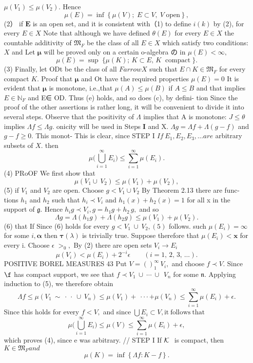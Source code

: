 $\mu(V_{1})\leq\mu(V_{2}).$ Hence $$ \mu(E)=\operatorname*{inf}\left\{\mu(V);\;E\subset V,\;V\;\mathrm{open}\right\}\!, $$ (2） if $\boldsymbol{E}$ is an open set, and it is consistent with（1) to define $\scriptstyle{i(k)}$ by (2), for every $\scriptstyle{E\in X}$ Note that although we have defined $\scriptstyle{\theta(E)}$ for every $\scriptstyle{E\in X}$ the countable additivity of ${\mathfrak{M}}_{F}$ be the class of all $\scriptstyle{E\in X}$ which satisfy two conditions: $X$ and Let ${\boldsymbol{\mu}}$ will be proved only on a certain o-algebra の in $\mu(E)<\infty,$ $$ \mu(E)=\operatorname*{sup}\;\{\mu(K);\,K\subset E,\,K\;\operatorname{compact}\}. $$ (3) Finally, let ODt be the class of all $\scriptstyle{F arrow X}$ such that $E\cap K\in{\mathfrak{M}}_{F}$ for every compact $K.$ Proof that ${\boldsymbol{\mu}}$ and Ot have the required properties $\mu(E)=0$ It is evident that $\boldsymbol{\mu}$ is monotone, i.e.,that $\mu(A)\leq\mu(B)$ if $\scriptstyle A\leq B$ and that implies $E\in\mathbb{N}_{F}$ and E∈ OD. Thus (e) holds, and so does (c), by defini- tion Since the proof of the other assertions is rather long, it will be convenient to divide it into several steps. Observe that the positivity of $\Lambda$ implies that A is monotone: $\scriptstyle J\leq\theta$ implies $\Lambda f\leq\Lambda g.$ onicity will be used in Steps $\mathbf{I}$ and $\mathrm{X}.$ $\Lambda g=\Lambda f+\Lambda(g-f)$ and $g-f\geq0.$ This monot- This is clear, since STEP I $I f\ E_{1},E_{2},E_{3},\dots a r e$ arbitrary subsets of $X.$ then $$ \mu{\Bigg(}\bigcup_{i=1}^{\infty}E_{i}{\Bigg)}\leq\sum_{i=1}^{\infty}\mu(E_{i}). $$ (4) PRoOF We first show that $$ \mu(V_{1}\cup\ V_{2})\leq\mu(V_{1})+\mu(V_{2}), $$ (5) if ${\mathit{V}}_{1}$ and ${\mathit{V}}_{2}$ are open. Choose $g<V_{1}\cup V_{2}$ By Theorem 2.13 there are func- tions $h_{1}$ and $h_{2}$ such that $h_{i}\prec V_{i}$ and $h_{1}(x)+h_{2}(x)=1$ for all x in the support of ${\mathfrak{g}}.$ Hence $h_{i}g\prec V_{i},g=h_{1}g+h_{2}\,g,$ and so $$ \Lambda g=\Lambda(h_{1}g)+\Lambda(h_{2}g)\leq\mu(V_{1})+\mu(V_{2}). $$ (6) that If Since (6) holds for every $g<V_{1}\ \cup\ V_{2},(5)$ follows. such $\mu(E_{i})=\infty$ for some $i,\mathbf{\alpha}$ then $\mathbf{\tau}(\lambda)$ is trivially true. Suppose therefore that $\mu(E_{i})<\mathbf{x}$ for every i. Choose $\scriptstyle\epsilon\;>_{0},$ By (2) there are open sets $V_{i}\to E_{i}$ $$ \mu(V_{i})<\mu(E_{i})+2^{-i}\epsilon\qquad(i=1,\,2,\,3,\,\ldots). $$POSITIVE BOREL MEASURES 43 Put $V=\left(\right)_{1}^{\infty}\,V_{i},$ and choose $f\prec V.$ Since $\boldsymbol{\f}$ has compact support, we see that $f\prec V_{1}\ \cup\ \cdots\ \cup\ \ V_{n}$ for some ${\mathfrak{n}}.$ Applying induction to (5), we therefore obtain $$ \Lambda f\leq\mu(V_{1}\ \sim\ \cdot\ \cdot\ \cup\ V_{n})\leq\mu(V_{1})+\ \cdot\cdot\cdot+\mu(V_{n})\leq\sum_{i=1}^{\infty}\mu(E_{i})+\epsilon. $$ Since this holds for every $f<V,$ and since $\bigcup E_{i}\subset V,{\mathrm{it~follows~that}}$ $$ \mu{\bigg(}\bigcup_{i=1}^{\infty}E_{i}{\bigg)}\leq\mu(V)\leq\sum_{i=1}^{\infty}\mu(E_{i})+\epsilon, $$ which proves (4), since e was arbitrary. // STEP I If ${\cal K}\,\,$ is compact, then $K\in\mathfrak{M}_{F}a n d$ $$ \mu(K)=\operatorname*{inf}\left\{\Lambda f\colon K-f\right\}. $$ 